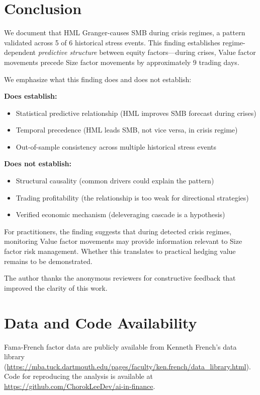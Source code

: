 \documentclass[sigconf]{acmart}
\begin{document}
\section{Conclusion}

We document that HML Granger-causes SMB during crisis regimes, a pattern validated
across 5 of 6 historical stress events. This finding establishes regime-dependent
\emph{predictive structure} between equity factors---during crises, Value factor
movements precede Size factor movements by approximately 9 trading days.

We emphasize what this finding does and does not establish:

\textbf{Does establish:}
\begin{itemize}
    \item Statistical predictive relationship (HML improves SMB forecast during crises)
    \item Temporal precedence (HML leads SMB, not vice versa, in crisis regime)
    \item Out-of-sample consistency across multiple historical stress events
\end{itemize}

\textbf{Does not establish:}
\begin{itemize}
    \item Structural causality (common drivers could explain the pattern)
    \item Trading profitability (the relationship is too weak for directional strategies)
    \item Verified economic mechanism (deleveraging cascade is a hypothesis)
\end{itemize}

For practitioners, the finding suggests that during detected crisis regimes,
monitoring Value factor movements may provide information relevant to Size factor
risk management. Whether this translates to practical hedging value remains to be
demonstrated.

\begin{acks}
The author thanks the anonymous reviewers for constructive feedback that improved
the clarity of this work.
\end{acks}

\section*{Data and Code Availability}
Fama-French factor data are publicly available from Kenneth French's data library
(\url{https://mba.tuck.dartmouth.edu/pages/faculty/ken.french/data_library.html}).
Code for reproducing the analysis is available at
\url{https://github.com/ChorokLeeDev/ai-in-finance}.


\end{document}
